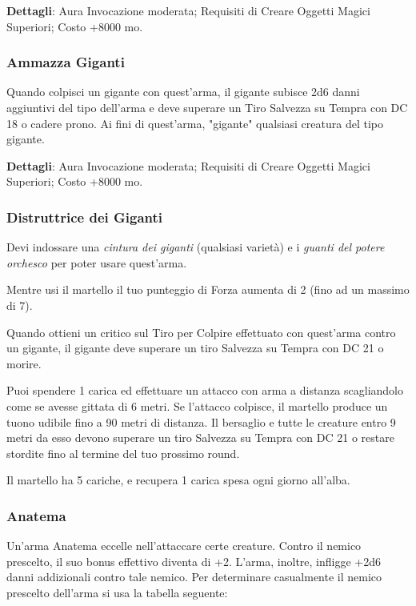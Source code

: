 \begin{multicols}{2}
	\textbf{Dettagli}: Aura Invocazione moderata; Requisiti di Creare Oggetti Magici Superiori; Costo +8000 mo.

	\subsubsection*{Ammazza Giganti}

	Quando colpisci un gigante con quest'arma, il gigante subisce 2d6 danni aggiuntivi del tipo dell'arma e deve superare un Tiro Salvezza su Tempra con DC 18 o cadere prono. Ai fini di quest'arma, "gigante" qualsiasi creatura del tipo gigante.

	\textbf{Dettagli}: Aura Invocazione moderata; Requisiti di Creare Oggetti Magici Superiori; Costo +8000 mo.

	\subsubsection*{Distruttrice dei Giganti}

	Devi indossare una \textit{cintura dei giganti} (qualsiasi varietà) e i \textit{guanti del potere orchesco} per poter usare quest'arma.

	Mentre usi il martello il tuo punteggio di Forza aumenta di 2 (fino ad un massimo di 7).

	Quando ottieni un critico sul Tiro per Colpire effettuato con quest'arma contro un gigante, il gigante deve superare un tiro Salvezza su Tempra con DC 21 o morire.

	Puoi spendere 1 carica ed effettuare un attacco con arma a distanza scagliandolo come se avesse gittata di 6 metri. Se l'attacco colpisce, il martello produce un tuono udibile fino a 90 metri di distanza. Il bersaglio e tutte le creature entro 9 metri da esso devono superare un tiro Salvezza su Tempra con DC 21 o restare stordite fino al termine del tuo prossimo round.

	Il martello ha 5 cariche, e recupera 1 carica spesa ogni giorno all'alba.

	\subsubsection*{Anatema}

	Un'arma Anatema eccelle nell'attaccare certe creature. Contro il nemico prescelto, il suo bonus effettivo diventa di +2. L'arma, inoltre, infligge +2d6 danni addizionali contro tale nemico. Per determinare casualmente il nemico prescelto dell'arma si usa la tabella seguente:


\end{multicols}
